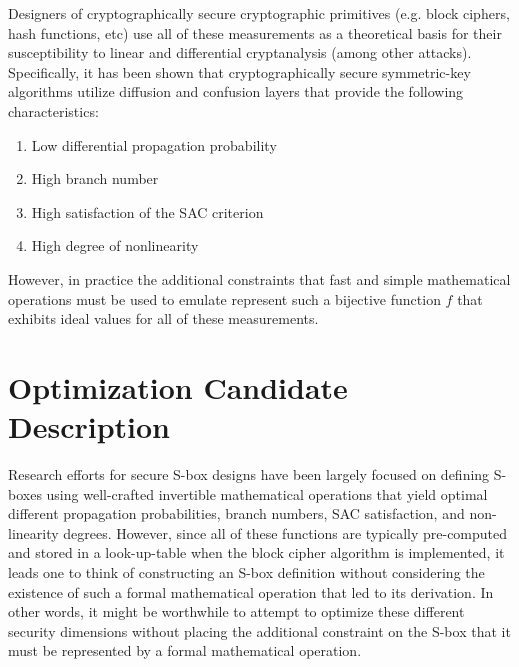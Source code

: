 \documentclass[11pt]{article}
\begin{document}
Designers of cryptographically secure cryptographic primitives (e.g. block ciphers, hash functions, etc) use all of these measurements as a theoretical basis for their susceptibility to linear and differential cryptanalysis (among other attacks). Specifically, it has been shown that cryptographically secure symmetric-key algorithms utilize diffusion and confusion layers that provide the following characteristics:
\begin{enumerate}
	\item Low differential propagation probability
	\item High branch number
	\item High satisfaction of the SAC criterion
	\item High degree of nonlinearity
\end{enumerate}
However, in practice the additional constraints that fast and simple mathematical operations must be used to emulate represent such a bijective function $f$ that exhibits ideal values for all of these measurements.

\section{Optimization Candidate Description}

Research efforts for secure S-box designs have been largely focused on defining S-boxes using well-crafted invertible mathematical operations that yield optimal different propagation probabilities, branch numbers, SAC satisfaction, and non-linearity degrees. However, since all of these functions are typically pre-computed and stored in a look-up-table when the block cipher algorithm is implemented, it leads one to think of constructing an S-box definition without considering the existence of such a formal mathematical operation that led to its derivation. In other words, it might be worthwhile to attempt to optimize these different security dimensions without placing the additional constraint on the S-box that it must be represented by a formal mathematical operation.
\end{document}
